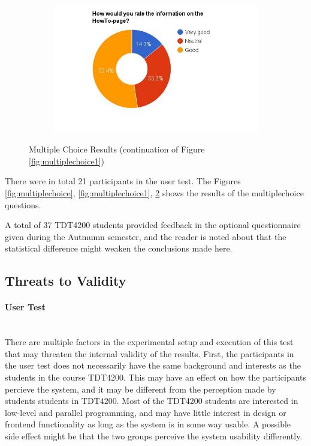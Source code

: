 \begin{figure}
    \begin{subfigure}[h]{0.48\textwidth}
        \centerline{\includegraphics[width=1.5\textwidth]{results/howto_cmb.jpg}}
        \caption{}
        \label{fig:cmb-howto}
    \end{subfigure}
    \caption{Multiple Choice Results (continuation of Figure \ref{fig:multiplechoice1})}
    \label{fig:multiplechoice2}
\end{figure}

There were in total 21 participants in the user test. The Figures \ref{fig:multiplechoice}, \ref{fig:multiplechoice1}, \ref{fig:multiplechoice2} shows the results of the multiplechoice questions.


A total of 37 TDT4200 students provided feedback in the optional questionnaire given during the Autmumn semester, and the reader is noted about that the statistical difference might weaken the conclusions made here.

\subsection{Threats to Validity}
\paragraph*{User Test} \hfill \\
There are multiple factors in the experimental setup and execution of this test that may threaten the internal validity of the results. First, the participants in the user test does not necessarily have the same background and interests as the students in the course TDT4200. This may have an effect on how the participants percieve the system, and it may be different from the perception made by students students in TDT4200. Most of the TDT4200 students are interested in low-level and parallel programming, and may have little interest in design or frontend functionality as long as the system is in some way usable. A possible side effect might be that the two groups perceive the system usability differently. \\

